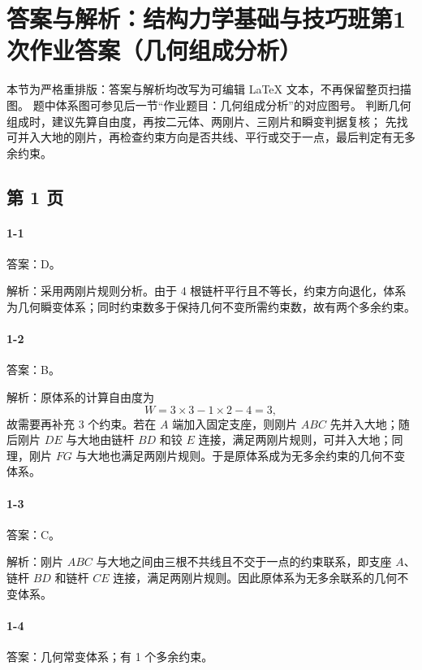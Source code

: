 \section{答案与解析：结构力学基础与技巧班第1次作业答案（几何组成分析）}

\begin{analysisbox}
本节为严格重排版：答案与解析均改写为可编辑 LaTeX 文本，不再保留整页扫描图。
题中体系图可参见后一节“作业题目：几何组成分析”的对应图号。
判断几何组成时，建议先算自由度，再按二元体、两刚片、三刚片和瞬变判据复核；
先找可并入大地的刚片，再检查约束方向是否共线、平行或交于一点，最后判定有无多余约束。
\end{analysisbox}

\subsection*{第 1 页}

\paragraph{1-1}
答案：D。

解析：采用两刚片规则分析。由于 4 根链杆平行且不等长，约束方向退化，体系为几何瞬变体系；同时约束数多于保持几何不变所需约束数，故有两个多余约束。

\paragraph{1-2}
答案：B。

解析：原体系的计算自由度为
\[
W=3\times 3-1\times 2-4=3,
\]
故需要再补充 3 个约束。若在 $A$ 端加入固定支座，则刚片 $ABC$ 先并入大地；随后刚片 $DE$ 与大地由链杆 $BD$ 和铰 $E$ 连接，满足两刚片规则，可并入大地；同理，刚片 $FG$ 与大地也满足两刚片规则。于是原体系成为无多余约束的几何不变体系。

\paragraph{1-3}
答案：C。

解析：刚片 $ABC$ 与大地之间由三根不共线且不交于一点的约束联系，即支座 $A$、链杆 $BD$ 和链杆 $CE$ 连接，满足两刚片规则。因此原体系为无多余联系的几何不变体系。

\paragraph{1-4}
答案：几何常变体系；有 1 个多余约束。

